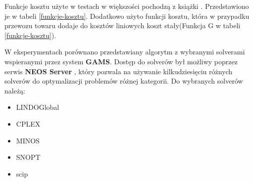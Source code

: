 Funkcje kosztu użyte w testach w większości pochodzą z książki \cite{ALG-GEN-BOOK}. Przedstawiono je w tabeli \ref{funkcje-kosztu}. Dodatkowo 
użyto funkcji kosztu, która w przypadku przewozu towaru dodaje do kosztów liniowych koszt stały(Funkcja G w tabeli \ref{funkcje-kosztu}).

W eksperymentach porównano przedstawiany algorytm z wybranymi solverami wspieranymi przez system \textbf{GAMS}. Dostęp do solverów był możliwy poprzez serwis 
\textbf{NEOS Server} \cite{NEOS-1,NEOS-2,NEOS-3}, który pozwala na używanie kilkudziesięciu różnych solverów do optymalizacji problemów różnej kategorii. Do wybranych 
solverów należą:

\begin{itemize}
    \item LINDOGlobal
    \item CPLEX
    \item MINOS
    \item SNOPT
    \item scip
\end{itemize}

\newpage

